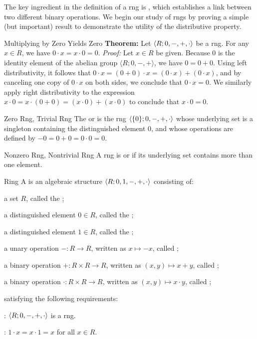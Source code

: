 \documentclass[12pt]{report}
\begin{document}
The key ingredient in the definition of a rng is , which establishes a link between two different binary operations. We begin our study of rngs by proving a simple (but important) result to demonstrate the utility of the distributive property.

\begin{thmbox}{Multiplying by Zero Yields Zero}
	\textbf{Theorem:} Let ${\langle {R; 0, -, +, \cdot} \rangle}$ be a rng. For any $x \in R$, we have $0 \cdot x = x \cdot 0 = 0$.
\tcblower
	\textit{Proof:} Let $x \in R$ be given. Because $0$ is the identity element of the abelian group $\langle R; 0, -, + \rangle$, we have $0 = 0 + 0$. Using left distributivity, it follows that $0 \cdot x = (0 + 0) \cdot x = (0 \cdot x) + (0 \cdot x)$, and by canceling one copy of $0 \cdot x$ on both sides, we conclude that $0 \cdot x = 0$. We similarly apply right distributivity to the expression $x \cdot 0 = x \cdot (0 + 0) = (x \cdot 0) + (x \cdot 0)$ to conclude that $x \cdot 0 = 0$.
\end{thmbox}

\begin{dfnbox}{Zero Rng, Trivial Rng}
	The  or  is the rng ${\langle { \{0\}; 0, -, +, \cdot } \rangle}$ whose underlying set is a singleton containing the distinguished element $0$, and whose operations are defined by $-0 = 0 + 0 = 0 \cdot 0 = 0$.
\end{dfnbox}

\begin{dfnbox}{Nonzero Rng, Nontrivial Rng}
	A rng is  or  if its underlying set contains more than one element.
\end{dfnbox}

\begin{dfnbox}{Ring}
	A  is an algebraic structure ${\langle {R; 0, 1, -, +, \cdot} \rangle}$ consisting of:
	\begin{boxitems}
		\item a set $R$, called the ;
		\item a distinguished element $0 \in R$, called the ;
		\item a distinguished element $1 \in R$, called the ;
		\item a unary operation $-: R \to R$, written as $x \mapsto -x$, called ;
		\item a binary operation $+: R \times R \to R$, written as $(x, y) \mapsto x + y$, called ;
		\item a binary operation $\cdot: R \times R \to R$, written as $(x, y) \mapsto x \cdot y$, called ;
	\end{boxitems}
	satisfying the following requirements:
	\begin{boxitems}
		\item {}: ${\langle {R; 0, -, +, \cdot} \rangle}$ is a rng.
		\item {}: $1 \cdot x = x \cdot 1 = x$ for all $x \in R$.
	\end{boxitems}
\end{dfnbox}
\end{document}
